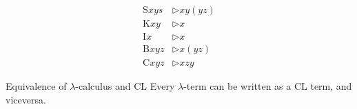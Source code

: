 \documentclass[a4paper, 12pt]{report}
\begin{document}
    \begin{equation*}
        \begin{split}
            \mathrm S xys &\triangleright xy(yz) \\
            \mathrm K xy &\triangleright x \\
            \mathrm I x &\triangleright x \\
            \mathrm B xyz &\triangleright x(yz) \\
            \mathrm C xyz &\triangleright xzy
        \end{split}
    \end{equation*}

    \begin{framedthm}{Equivalence of $\lambda$-calculus and CL}
        Every $\lambda$-term can be written as a CL term, and viceversa.
    \end{framedthm}
\end{document}
